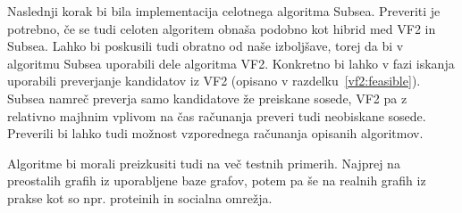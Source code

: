 \documentclass[a4paper, 12pt, ]{book}
\renewcommand{\baselinestretch}{1.3} %
\newcommand{\clearemptydoublepage}{\newpage{\pagestyle{empty}\cleardoublepage}}
\begin{document}
	Naslednji korak bi bila implementacija celotnega algoritma Subsea. Preveriti je potrebno, če se tudi celoten algoritem obnaša podobno kot hibrid med
	VF2 in Subsea. Lahko bi poskusili tudi obratno od naše izboljšave, torej da bi v algoritmu Subsea uporabili dele algoritma VF2. Konkretno bi lahko v
	fazi iskanja uporabili preverjanje kandidatov iz VF2 (opisano v razdelku~\ref{vf2:feasible}). Subsea namreč preverja samo kandidatove že preiskane
	sosede, VF2 pa z relativno majhnim vplivom na čas računanja preveri tudi neobiskane sosede. Preverili bi lahko tudi možnost vzporednega računanja
	opisanih algoritmov.

	Algoritme bi morali preizkusiti tudi na več testnih primerih. Najprej na preostalih grafih iz uporabljene baze grafov, potem pa še na realnih grafih iz
	prakse kot so npr. proteinih in socialna omrežja.


	
\clearemptydoublepage
\renewcommand{\baselinestretch}{1.0} %
\appendix
\end{document}

